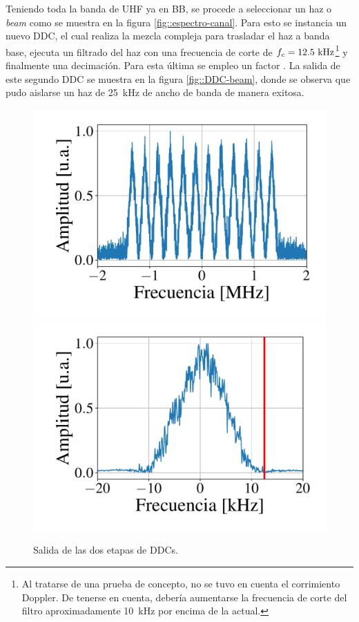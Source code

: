 \documentclass[../../main.tex]{subfiles}
\begin{document}
Teniendo toda la banda de UHF ya en BB, se procede a seleccionar un haz o \textit{beam} como se muestra en la figura \ref{fig::espectro-canal}. 
Para esto se instancia un nuevo DDC, el cual realiza la mezcla compleja para trasladar el haz a banda base, ejecuta un filtrado del haz con una frecuencia de corte de $f_c = 12.5~\textrm{kHz}$\footnote{Al tratarse de una prueba de concepto, no se tuvo en cuenta el corrimiento Doppler. 
De tenerse en cuenta, debería aumentarse la frecuencia de corte del filtro aproximadamente 10~kHz por encima de la actual.} y finalmente una decimación. 
Para esta última se empleo un factor . La salida de este segundo DDC se muestra en la figura \ref{fig::DDC-beam}, donde se observa que pudo aislarse un haz de 25~kHz de ancho de banda de manera exitosa.


\begin{figure}[H]
    \centering
    {\includegraphics[width=0.49\linewidth]{DDC-band.pdf}}
    \hspace{\fill}%
    {\includegraphics[width=0.49\linewidth]{DDC-beam.pdf}}
    \caption{Salida de las dos etapas de DDCs.}
    \label{fig::DDC-output}
\end{figure}
\end{document}
